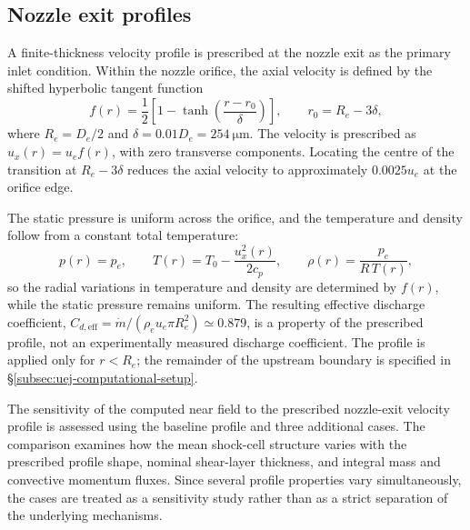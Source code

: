 \subsection{Nozzle exit profiles}
\label{subsec:uej-inlet-profiles}

A finite-thickness velocity profile is prescribed at the nozzle exit as the
primary inlet condition. Within the nozzle orifice, the axial velocity
is defined by the shifted hyperbolic tangent function
\begin{equation}
    f(r)=\frac{1}{2}
    \left[1-\tanh\left(\frac{r-r_0}{\delta}\right)\right],
    \qquad r_0=R_e-3\delta,
    \label{eq:uej-tanh-profile}
\end{equation}
where \(R_e=D_e/2\) and \(\delta=0.01D_e=\SI{254}{\micro\meter}\). The
velocity is prescribed as \(u_x(r)=u_e f(r)\), with zero transverse
components. Locating the centre of the transition at \(R_e-3\delta\) reduces
the axial velocity to approximately \(0.0025u_e\) at the orifice edge.

The static pressure is uniform across the orifice, and the temperature and
density follow from a constant total temperature:
\[
    p(r)=p_e,
    \qquad
    T(r)=T_0-\frac{u_x^2(r)}{2c_p},
    \qquad
    \rho(r)=\frac{p_e}{R\,T(r)},
\]
so the radial variations in temperature and density are determined by
\(f(r)\), while the static pressure remains uniform. The resulting effective
discharge coefficient,
\(C_{d,\mathrm{eff}}=\dot m/(\rho_e u_e\pi R_e^2)\simeq0.879\), is a
property of the prescribed profile, not an experimentally measured discharge
coefficient. The profile is applied only for \(r<R_e\); the remainder of the
upstream boundary is specified in \S\ref{subsec:uej-computational-setup}.

The sensitivity of the computed near field to the prescribed nozzle-exit
velocity profile is assessed using the baseline profile and three additional
cases. The comparison examines how the mean shock-cell structure varies with
the prescribed profile shape, nominal shear-layer thickness, and integral
mass and convective momentum fluxes. Since several profile properties vary
simultaneously, the cases are treated as a sensitivity study rather than as a
strict separation of the underlying mechanisms.

